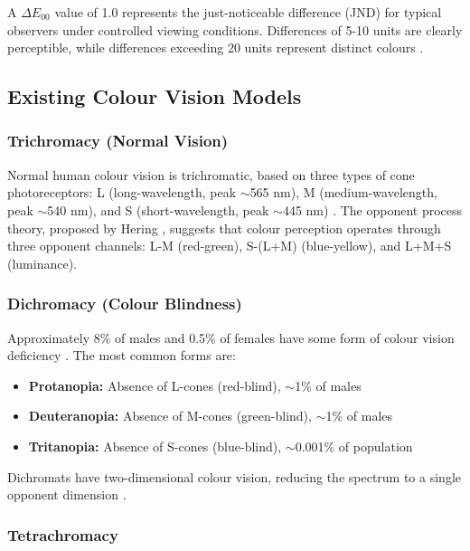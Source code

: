 \documentclass[12pt,a4paper]{article}
\newcommand{\deltaE}{\Delta E_{00}}
\begin{document}
A $\deltaE$ value of 1.0 represents the just-noticeable difference (JND) for typical observers under controlled viewing conditions. Differences of 5-10 units are clearly perceptible, while differences exceeding 20 units represent distinct colours \cite{mokrzycki2011colour}.

\subsection{Existing Colour Vision Models}

\subsubsection{Trichromacy (Normal Vision)}

Normal human colour vision is trichromatic, based on three types of cone photoreceptors: L (long-wavelength, peak $\sim$565 nm), M (medium-wavelength, peak $\sim$540 nm), and S (short-wavelength, peak $\sim$445 nm) \cite{stockman2000spectral}. The opponent process theory, proposed by Hering \cite{hering1878zur}, suggests that colour perception operates through three opponent channels: L-M (red-green), S-(L+M) (blue-yellow), and L+M+S (luminance).

\subsubsection{Dichromacy (Colour Blindness)}

Approximately 8\% of males and 0.5\% of females have some form of colour vision deficiency \cite{sharpe1999opsin}. The most common forms are:

\begin{itemize}
\item \textbf{Protanopia:} Absence of L-cones (red-blind), $\sim$1\% of males
\item \textbf{Deuteranopia:} Absence of M-cones (green-blind), $\sim$1\% of males
\item \textbf{Tritanopia:} Absence of S-cones (blue-blind), $\sim$0.001\% of population
\end{itemize}

Dichromats have two-dimensional colour vision, reducing the spectrum to a single opponent dimension \cite{brettel1997computerized,vienot1999digital}.

\subsubsection{Tetrachromacy}
\end{document}
